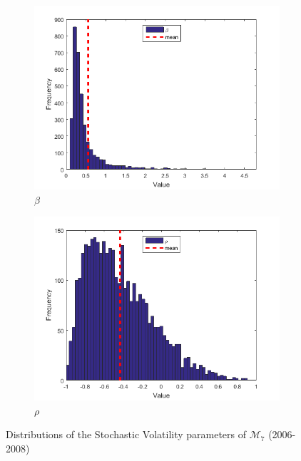 \documentclass[11pt,a4,twosided,singlespacing,titlepagenumber=on]{scrreprt}
\numberwithin{equation}{chapter} %
\theoremstyle{remark}
\begin{document}
\begin{figure}[H]
\begin{subfigure}[t]{0.32\textwidth}
        \includegraphics[width=1\textwidth]{res/params/5845_6575/5}
        \caption{$\beta$}
    \end{subfigure}
    \begin{subfigure}[t]{0.32\textwidth}
        \centering
        \includegraphics[width=1\textwidth]{res/params/5845_6575/6}
        \caption{$\rho$}
    \end{subfigure}
    \caption[]{Distributions of the Stochastic Volatility parameters of $\mathcal{M}_7$ (2006-2008)}
    \label{fig:param_dists_2000_2002}
\end{figure}
\end{document}
